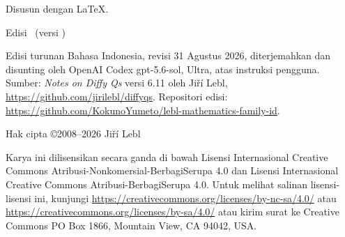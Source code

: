 \documentclass[12pt]{book}
\begin{document}
\newpage

\vspace*{\fill}

\begin{small}
\noindent
Disusun dengan \LaTeX.

\bigskip

\noindent
Edisi \theedition\ (versi \theversion)

\medskip

\noindent
Edisi turunan Bahasa Indonesia, revisi 31 Agustus 2026, diterjemahkan dan
disunting oleh OpenAI Codex gpt-5.6-sol, Ultra, atas instruksi pengguna.
Sumber: \emph{Notes on Diffy Qs} versi 6.11 oleh Ji\v{r}\'i Lebl,
\url{https://github.com/jirilebl/diffyqs}.
Repositori edisi: \url{https://github.com/KokunoYumeto/lebl-mathematics-family-id}.

\bigskip

\noindent
Hak cipta \copyright 2008--2026 Ji\v{r}\'i Lebl


%


\bigskip

\noindent
{}
\quad
{}

\bigskip

\noindent
Karya ini
dilisensikan secara ganda di bawah
Lisensi Internasional Creative Commons
Atribusi-Non\-komersial-BerbagiSerupa 4.0 dan
Lisensi Internasional Creative Commons
Atribusi-BerbagiSerupa 4.0.
Untuk melihat
salinan lisensi-lisensi ini, kunjungi
\url{https://creativecommons.org/licenses/by-nc-sa/4.0/}
atau
\url{https://creativecommons.org/licenses/by-sa/4.0/}
atau kirim surat ke
Creative Commons
PO Box 1866, Mountain View, CA 94042, USA\@.


\end{small}
\end{document}
